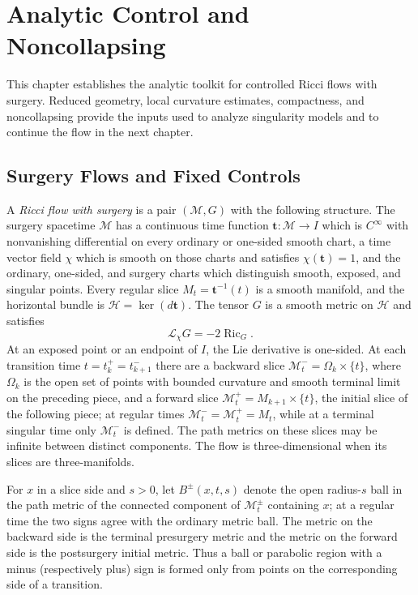 \chapter{Analytic Control and Noncollapsing}

This chapter establishes the analytic toolkit for controlled Ricci flows with
surgery.  Reduced geometry, local curvature estimates, compactness, and
noncollapsing provide the inputs used to analyze singularity models and to
continue the flow in the next chapter.

\section{Surgery Flows and Fixed Controls}

\begin{definition}
\label{def:ricci-flow-with-surgery}
\notready
A \emph{Ricci flow with surgery} is a pair $(\mathcal M,G)$ with the
following structure.  The surgery spacetime $\mathcal M$ has a continuous
time function $\mathbf t\colon\mathcal M\to I$ which is $C^\infty$ with
nonvanishing differential on every ordinary or one-sided smooth chart, a
time vector field $\chi$ which is smooth on those charts and satisfies
$\chi(\mathbf t)=1$, and the ordinary, one-sided, and surgery charts
which distinguish smooth, exposed, and singular points.  Every regular slice
$M_t=\mathbf t^{-1}(t)$ is a smooth manifold, and the horizontal bundle is
$\mathcal H=\ker(d\mathbf t)$.  The tensor $G$ is a smooth metric on
$\mathcal H$ and satisfies
\[
 \mathcal L_\chi G=-2\operatorname{Ric}_G.
\]
At an exposed point or an endpoint of $I$, the Lie derivative is one-sided.
At each transition time $t=t_k^+=t_{k+1}^-$ there are a backward slice
$\mathcal M_t^- = \Omega_k\times\{t\}$, where $\Omega_k$ is the open set of
points with bounded curvature and smooth terminal limit on the preceding
piece, and a forward slice $\mathcal M_t^+=M_{k+1}\times\{t\}$, the initial
slice of the following piece; at regular times
$\mathcal M_t^- = \mathcal M_t^+=M_t$, while at a terminal singular time only
$\mathcal M_t^-$ is defined.  The path metrics on these slices may be
infinite between distinct components.  The flow is three-dimensional when
its slices are three-manifolds.

For $x$ in a slice side and $s>0$, let
$B^\pm(x,t,s)$ denote the open radius-$s$ ball in the path metric of the
connected component of $\mathcal M_t^\pm$ containing $x$; at a regular time the
two signs agree with the ordinary metric ball.  The metric on the backward
side is the terminal presurgery metric and the metric on the forward side is
the postsurgery initial metric.  Thus a ball or parabolic region with a minus
(respectively plus) sign is formed only from points on the corresponding side
of a transition.


\end{definition}
